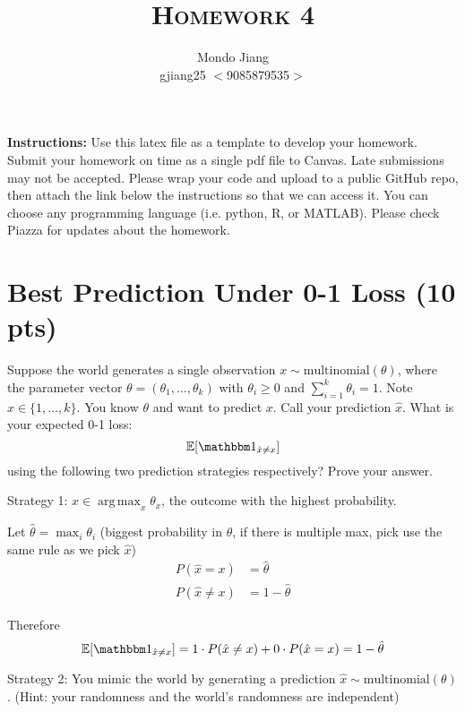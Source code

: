 \documentclass[a4paper]{article}
\title{\textsc{Homework 4}} %
\author{
  Mondo Jiang\\
  gjiang25 $<$9085879535$>$
}
\date{}
\theoremstyle{definition}
\DeclareMathOperator*{\argmax}{arg\,max}
\def\E{\mathbb E}
\def\ind{\mathbbm 1}
\newenvironment{soln}{
    \leavevmode\color{blue}\ignorespaces
}{}
\begin{document}
\maketitle


\textbf{Instructions:} Use this latex file as a template to develop your homework. Submit your homework on time as a single pdf file to Canvas. Late submissions may not be accepted. Please wrap your code and upload to a public GitHub repo, then attach the link below the instructions so that we can access it. You can choose any programming language (i.e. python, R, or MATLAB). Please check Piazza for updates about the homework.

\section{Best Prediction Under 0-1 Loss (10 pts)}
Suppose the world generates a single observation $x \sim \mbox{multinomial}(\theta)$, where the parameter vector $\theta=(\theta_1, \ldots, \theta_k)$ with $\theta_i\ge 0$ and $\sum_{i=1}^k \theta_i=1$.  Note $x \in \{1, \ldots, k\}$.
You know $\theta$ and want to predict $x$.
Call your prediction $\hat x$.  What is your expected 0-1 loss:
$$\E[\ind_{\hat x \neq x}]$$
using the following two prediction strategies respectively?  Prove your answer.


Strategy 1: $\hat x \in \argmax_x \theta_x$, the outcome with the highest probability.

\begin{soln}
	Let $\hat \theta    = \max_i \theta_i $ (biggest probability in $\theta$, if there is multiple max, pick use the same rule as we pick $\hat x$)
	\begin{align*}
		P(\hat{x} = x)    & = \hat \theta     \\
		P(\hat{x} \neq x) & = 1 - \hat \theta
	\end{align*}

	Therefore
	\[
		\E[\ind_{\hat x \neq x}] = 1 \cdot P(\hat{x} \neq x) + 0 \cdot P(\hat{x} = x) = 1 - \hat \theta
	\]
\end{soln}

Strategy 2: You mimic the world by generating a prediction $\hat x \sim \mbox{multinomial}(\theta)$.  (Hint: your randomness and the world's randomness are independent)
\end{document}
